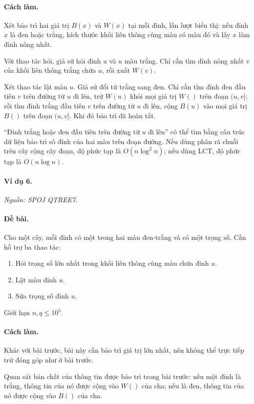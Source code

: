 \documentclass[11pt]{article}
\begin{document}
\paragraph{Cách làm.}
Xét bảo trì hai giá trị \(B(x)\) và \(W(x)\) tại mỗi đỉnh, lần lượt biểu thị:
nếu đỉnh \(x\) là đen hoặc trắng, kích thước khối liên thông cùng màu có màu đó
và lấy \(x\) làm đỉnh nông nhất.

Với thao tác hỏi, giả sử hỏi đỉnh \(u\) và \(u\) màu trắng. Chỉ cần tìm đỉnh
nông nhất \(v\) của khối liên thông trắng chứa \(u\), rồi xuất \(W(v)\).

Xét thao tác lật màu \(u\). Giả sử đổi từ trắng sang đen. Chỉ cần tìm đỉnh đen
đầu tiên \(v\) trên đường từ \(u\) đi lên, trừ \(W(u)\) khỏi mọi giá trị \(W()\)
trên đoạn \((u,v]\); rồi tìm đỉnh trắng đầu tiên \(v\) trên đường từ \(u\) đi
lên, cộng \(B(u)\) vào mọi giá trị \(B()\) trên đoạn \((u,v]\). Khi đó bảo trì
đã hoàn tất.

``Đỉnh trắng hoặc đen đầu tiên trên đường từ \(u\) đi lên'' có thể tìm bằng cấu
trúc dữ liệu bảo trì số đỉnh của hai màu trên đoạn đường. Nếu dùng phân rã chuỗi
trên cây cộng cây đoạn, độ phức tạp là \(O(n\log^2 n)\); nếu dùng LCT, độ phức
tạp là \(O(n\log n)\).

\paragraph{Ví dụ 6.}
\emph{Nguồn: SPOJ QTREE7.}

\paragraph{Đề bài.}
Cho một cây, mỗi đỉnh có một trong hai màu đen-trắng và có một trọng số. Cần hỗ
trợ ba thao tác:
\begin{enumerate}
  \item Hỏi trọng số lớn nhất trong khối liên thông cùng màu chứa đỉnh \(u\).
  \item Lật màu đỉnh \(u\).
  \item Sửa trọng số đỉnh \(u\).
\end{enumerate}
Giới hạn \(n,q\le 10^5\).

\paragraph{Cách làm.}
Khác với bài trước, bài này cần bảo trì giá trị lớn nhất, nên không thể trực
tiếp trừ đóng góp như ở bài trước.

Quan sát bản chất của thông tin được bảo trì trong bài trước: nếu một đỉnh là
trắng, thông tin của nó được cộng vào \(W()\) của cha; nếu là đen, thông tin của
nó được cộng vào \(B()\) của cha.
\end{document}
